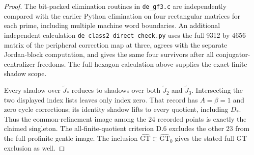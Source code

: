 \begin{proof}
The bit-packed elimination routines in \texttt{de\_gf3.c} are
independently compared with the earlier Python elimination on four
rectangular matrices for each prime, including multiple machine
word boundaries. An additional independent calculation
\texttt{de\_class2\_direct\_check.py} uses the full 9312 by 4656
matrix of the peripheral correction map at three, agrees with the
separate Jordan-block computation, and gives the same four
survivors after all conjugator-centralizer freedoms. The full
hexagon calculation above supplies the exact finite-shadow scope.

Every shadow over $\widetilde J_*$ reduces to shadows over both
$\widetilde J_2$ and $\widetilde J_3$. Intersecting the two
displayed index lists leaves only index zero. That record has
$A=\beta=1$ and zero cycle corrections; its identity shadow lifts
to every quotient, including $D_*$. Thus the common-refinement
image among the 24 recorded points is exactly the claimed singleton.
The all-finite-quotient criterion D.6 excludes the other 23 from
the full profinite gentle image. The inclusion
$\widehat{\mathrm{GT}}\subset\widehat{\mathrm{GT}}_0$ gives the
stated full GT exclusion as well.
\end{proof}

